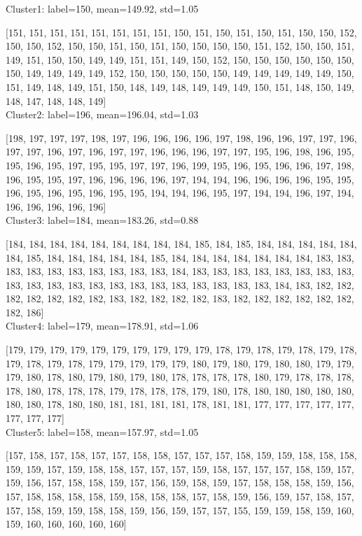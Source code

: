 \documentclass{article}
\begin{document}
\begin{latin}
Cluster1: label=150, mean=149.92, std=1.05

[151, 151, 151, 151, 151, 151, 151, 151, 150, 151, 150, 151, 150, 151, 150, 150, 152, 150, 150, 152, 150, 150, 151, 150, 151, 150, 150, 150, 150, 151, 152, 150, 150, 151, 149, 151, 150, 150, 149, 149, 151, 151, 149, 150, 152, 150, 150, 150, 150, 150, 150, 150, 149, 149, 149, 149, 152, 150, 150, 150, 150, 150, 149, 149, 149, 149, 149, 150, 151, 149, 148, 149, 151, 150, 148, 149, 148, 149, 149, 149, 150, 151, 148, 150, 149, 148, 147, 148, 148, 149]
\\

Cluster2: label=196, mean=196.04, std=1.03

[198, 197, 197, 197, 198, 197, 196, 196, 196, 196, 197, 198, 196, 196, 197, 197, 196, 197, 197, 196, 197, 196, 197, 197, 196, 196, 196, 197, 197, 195, 196, 198, 196, 195, 195, 196, 195, 197, 195, 195, 197, 197, 196, 199, 195, 196, 195, 196, 196, 197, 198, 196, 195, 195, 197, 196, 196, 196, 196, 197, 194, 194, 196, 196, 196, 196, 195, 195, 196, 195, 196, 195, 196, 195, 195, 194, 194, 196, 195, 197, 194, 194, 196, 197, 194, 196, 196, 196, 196, 196]
\\

Cluster3: label=184, mean=183.26, std=0.88

[184, 184, 184, 184, 184, 184, 184, 184, 184, 185, 184, 185, 184, 184, 184, 184, 184, 184, 185, 184, 184, 184, 184, 184, 185, 184, 184, 184, 184, 184, 184, 184, 183, 183, 183, 183, 183, 183, 183, 183, 183, 183, 184, 183, 183, 183, 183, 183, 183, 183, 183, 183, 183, 183, 183, 183, 183, 183, 183, 183, 183, 183, 183, 183, 184, 183, 182, 182, 182, 182, 182, 182, 182, 183, 182, 182, 182, 182, 183, 182, 182, 182, 182, 182, 182, 182, 186]
\\

Cluster4: label=179, mean=178.91, std=1.06

[179, 179, 179, 179, 179, 179, 179, 179, 179, 179, 178, 179, 178, 179, 178, 179, 178, 179, 178, 179, 178, 179, 179, 179, 179, 179, 180, 179, 180, 179, 180, 180, 179, 179, 179, 180, 178, 180, 179, 180, 179, 180, 178, 178, 178, 178, 180, 179, 178, 178, 178, 178, 180, 178, 178, 178, 179, 178, 178, 178, 179, 180, 178, 180, 180, 180, 180, 180, 180, 180, 178, 180, 180, 181, 181, 181, 181, 178, 181, 181, 177, 177, 177, 177, 177, 177, 177, 177]
\\

Cluster5: label=158, mean=157.97, std=1.05

[157, 158, 157, 158, 157, 157, 158, 158, 157, 157, 157, 158, 159, 159, 158, 158, 158, 159, 159, 157, 159, 158, 158, 157, 157, 157, 159, 158, 157, 157, 157, 158, 159, 157, 159, 156, 157, 158, 158, 159, 157, 156, 159, 158, 159, 157, 158, 158, 158, 159, 156, 157, 158, 158, 158, 158, 159, 158, 158, 158, 157, 158, 159, 156, 159, 157, 158, 157, 157, 158, 159, 159, 158, 158, 159, 156, 159, 157, 157, 155, 159, 159, 158, 159, 160, 159, 160, 160, 160, 160, 160]
\\


\end{latin}
\end{document}
